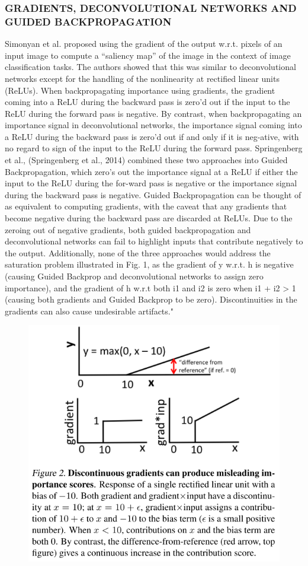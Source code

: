 \documentclass[]{scrartcl}
\begin{document}
\subsubsection{GRADIENTS, DECONVOLUTIONAL NETWORKS AND GUIDED BACKPROPAGATION}
Simonyan et al. \cite{Simonyan2014} proposed using the gradient of the output w.r.t. pixels of an input image to compute a “saliency map” of the image in the context of image classification tasks. The authors showed that this was similar to deconvolutional networks \cite{Zeiler2014} except for the handling of the nonlinearity at rectified linear units (ReLUs). When backpropagating importance using gradients, the gradient coming into a ReLU during the backward pass is zero’d out if the input to the ReLU during the forward pass is negative. By contrast, when backpropagating an importance signal in deconvolutional networks, the importance signal coming into a ReLU during the backward pass is zero’d out if and only if it is neg-ative, with no regard to sign of the input to the ReLU during the forward pass.
Springenberg et al., (Springenberg et al., 2014) combined these two approaches into Guided Backpropagation, which zero’s out the importance signal at a ReLU if either the input to the ReLU during the for-ward pass is negative or the importance signal during the backward pass is negative. Guided Backpropagation can be thought of as equivalent to computing gradients, with the caveat that any gradients that become negative during the backward pass are discarded at ReLUs. Due to the zeroing out of negative gradients, both guided backpropagation and deconvolutional networks can fail to highlight inputs that contribute negatively to the output. Additionally, none of the three approaches would address the saturation problem illustrated in Fig. 1, as the gradient of y w.r.t. h is negative (causing Guided Backprop and deconvolutional networks to assign zero importance), and the gradient of h w.r.t both i1 and i2 is zero when i1 + i2 > 1 (causing both gradients and Guided Backprop to be zero). Discontinuities in the gradients can also cause undesirable artifacts." \cite{Shrikumar2017}
\begin{figure}[h]
	\centering
	\includegraphics[width=0.6\linewidth]{discontinuity}
\end{figure}
\end{document}
